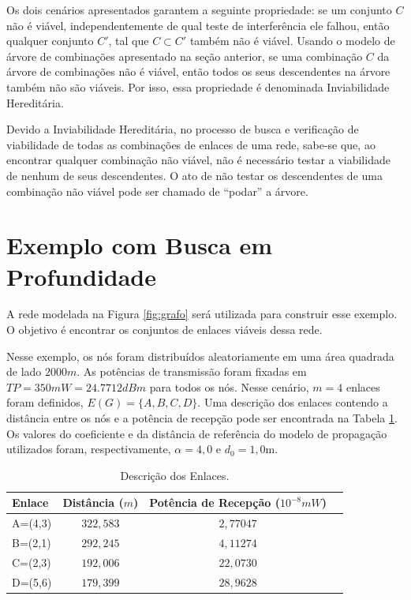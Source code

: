 Os dois cenários apresentados garantem a seguinte propriedade: se um conjunto $C$ não é viável, independentemente de qual teste de interferência ele falhou, então qualquer conjunto $C'$, tal que $C \subset C'$ também não é viável. Usando o modelo de árvore de combinações apresentado na seção anterior, se uma combinação $C$ da árvore de combinações não é viável, então todos os seus descendentes na árvore também não são viáveis. Por isso, essa propriedade é denominada Inviabilidade Hereditária. 

Devido a Inviabilidade Hereditária, no processo de busca e verificação de viabilidade de todas as combinações de enlaces de uma rede, sabe-se que, ao encontrar qualquer combinação não viável, não é necessário testar a viabilidade de nenhum de seus descendentes. O ato de não testar os descendentes de uma combinação não viável pode ser chamado de ``podar'' a árvore. 

\section{Exemplo com Busca em Profundidade}

A rede modelada na Figura \ref{fig:grafo} será utilizada para construir esse exemplo. O objetivo é encontrar os conjuntos de enlaces viáveis dessa rede. 

Nesse exemplo, os nós foram distribuídos aleatoriamente em uma área quadrada de lado $2000m$. As potências de transmissão foram fixadas em $TP=350mW=24.7712dBm$ para todos os nós. Nesse cenário, $m=4$ enlaces foram definidos, $E(G)=\{A, B, C, D\}$. Uma descrição dos enlaces contendo a distância entre os nós e a potência de recepção pode ser encontrada na Tabela \ref{table:enlaces}. Os valores do coeficiente e da distância de referência do modelo de propagação utilizados foram, respectivamente, $\alpha=4,0$ e $d_0=1,0$m.

\begin{table}[h]
\centering
\caption[Descrição dos Enlaces.]
{Descrição dos Enlaces.}
\label{table:enlaces}
\begin{tabular}{lccc}
\hline
Enlace & Distância ($m$) & Potência de Recepção ($10^{-8}mW$)\\ \hline
A=(4,3)	& $322,583$	& $2,77047$\\
B=(2,1)	& $292,245$	& $4,11274$\\
C=(2,3)	& $192,006$	& $22,0730$\\
D=(5,6)	& $179,399$	& $28,9628$
\end{tabular}
\end{table}

